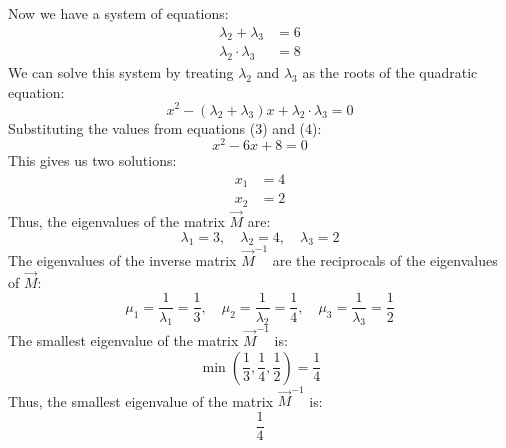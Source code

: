 \documentclass[a4paper, 12pt]{article}
\begin{document}
Now we have a system of equations:
\begin{align}
    \lambda_2 + \lambda_3 &= 6\\
    \lambda_2 \cdot \lambda_3 &= 8
\end{align}
We can solve this system by treating $\lambda_2$ and $\lambda_3$ as the roots of the quadratic equation:
\[x^2 - (\lambda_2 + \lambda_3)x + \lambda_2 \cdot \lambda_3 = 0\]
Substituting the values from equations (3) and (4):
\[x^2 - 6x + 8 = 0\]
This gives us two solutions:
\begin{align}
    x_1 &= 4\\
    x_2 &= 2
\end{align}
Thus, the eigenvalues of the matrix $\vec{M}$ are:
\[\lambda_1 = 3, \quad \lambda_2 = 4, \quad \lambda_3 = 2\]
The eigenvalues of the inverse matrix $\vec{M}^{-1}$ are the reciprocals of the eigenvalues of $\vec{M}$:
\[\mu_1 = \frac{1}{\lambda_1} = \frac{1}{3}, \quad \mu_2 = \frac{1}{\lambda_2} = \frac{1}{4}, \quad \mu_3 = \frac{1}{\lambda_3} = \frac{1}{2}\]
The smallest eigenvalue of the matrix $\vec{M}^{-1}$ is:
\[\min\left(\frac{1}{3}, \frac{1}{4}, \frac{1}{2}\right) = \frac{1}{4}\]
Thus, the smallest eigenvalue of the matrix $\vec{M}^{-1}$ is:
\[\boxed{\frac{1}{4}}\]
\end{document}
